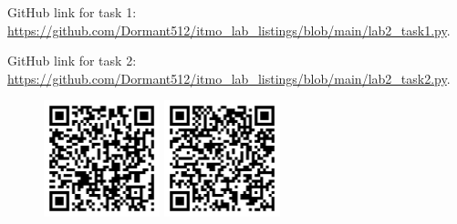 \documentclass[12pt, a4paper]{article}
\begin{document}
GitHub link for task 1: \url{https://github.com/Dormant512/itmo_lab_listings/blob/main/lab2_task1.py}.

GitHub link for task 2: \url{https://github.com/Dormant512/itmo_lab_listings/blob/main/lab2_task2.py}.

\begin{figure}[!h]
\centering
\includegraphics[width=0.3\textwidth]{lab2task1.png}
\includegraphics[width=0.3\textwidth]{lab2task2.png}
\end{figure}
\end{document}
